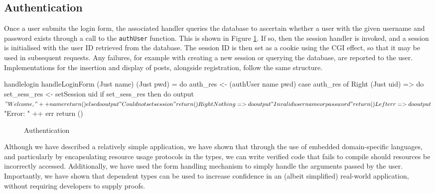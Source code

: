 \subsection{Authentication}

Once a user submits the login form, the associated handler queries the database
to ascertain whether a user with the given username and password exists through
a call to the \texttt{authUser} function. This is shown in Figure
\ref{fig:handlelogin}. If so, then the session handler is
invoked, and a session is initialised with the user ID retrieved from the
database. The session ID is then set as a cookie using the CGI effect, so that
it may be used in subsequent requests. Any failures, for example with creating
a new session or querying the database, are reported to the user.
Implementations for the insertion and display of posts, alongside registration,
follow the same structure.

\begin{SaveVerbatim}{handlelogin}
handleLoginForm (Just name) (Just pwd) = do
  auth_res <- (authUser name pwd)
  case auth_res of
    Right (Just uid) => do
      set_sess_res <- setSession uid
      if set_sess_res then do
        output $ "Welcome, " ++ name
        return ()
      else do
         output "Could not set session"
         return ()
    Right Nothing => do
      output "Invalid username or password"
      return ()
    Left err => do
      output $ "Error: " ++ err
      return ()
\end{SaveVerbatim}

\begin{figure}[h]
\caption{Authentication}
\label{fig:handlelogin}
\end{figure}

Although we have described a relatively simple application, we have shown that
through the use of embedded domain-specific languages, 
and particularly by encapsulating resource usage protocols in the types,
we can write verified
code that fails to compile should resources be incorrectly accessed.
Additionally, we have used the form handling mechanism to simply handle the
arguments passed by the user. Importantly, we have shown that dependent types
can be used to increase confidence in an (albeit simplified) real-world
application, without requiring developers to supply proofs.

